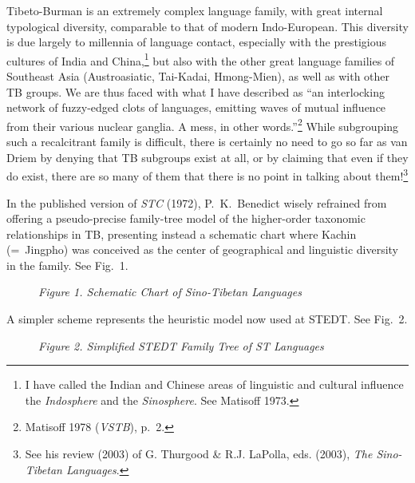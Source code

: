 Tibeto-Burman is an extremely complex language family, with great internal
typological diversity, comparable to that of modern Indo-European.  This
diversity is due largely to millennia of language contact, especially with the
prestigious cultures of India and China,\footnote{I have called the Indian and
Chinese areas of linguistic and cultural influence the \textit{Indosphere} and the
\textit{Sinosphere}. See Matisoff 1973.} but also with the other
great language families of Southeast Asia (Austroasiatic, Tai-Kadai,
Hmong-Mien), as well as with other TB groups.  We are thus faced with what I
have described as “an interlocking network of fuzzy-edged clots of languages,
emitting waves of mutual influence from their various nuclear ganglia.  A mess,
in other words.”\footnote{Matisoff 1978 (\textit{VSTB}), p.~2.}  While subgrouping such
a recalcitrant family is difficult, there is certainly no need to go so far as
van Driem by denying that TB subgroups exist at all, or by claiming that even if
they do exist, there are so many of them that there is no point in talking about
them!\footnote{See his review (2003) of G. Thurgood \& R.J. LaPolla, eds. (2003),
\textit{The Sino-Tibetan Languages}.}


In the published version of \textit{STC} (1972),
P.\ K.\ Benedict wisely refrained from offering a pseudo-precise family-tree model of
the higher-order taxonomic relationships in TB, presenting instead a schematic
chart where Kachin (=~Jingpho) was conceived as the center of geographical and
linguistic diversity in the family.  See Fig.~1.

\begin{figure}[ht]
\begin{center}
\textit{Figure 1. Schematic Chart of Sino-Tibetan Languages}\footnotemark
\end{center}
\end{figure}

A simpler scheme represents the heuristic model now used at STEDT.  See Fig.~2.

\begin{figure}[ht]
\begin{center}
\textit{Figure 2.  Simplified STEDT Family Tree of ST Languages}
\end{center}
\end{figure}

